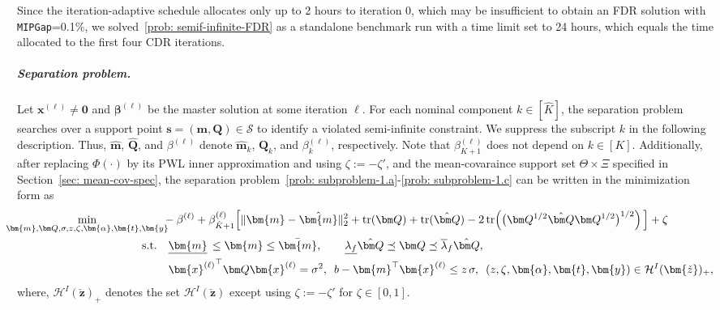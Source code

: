 \documentclass[opre,sglanonrev]{informs4}
\newcommand{\mS}{\mathcal{S}}
\newcommand{\mH}{\mathcal{H}}
\newcommand{\zz}{\check{z}}
\newcommand{\bzz}{\bm{\zz}}
\newcommand{\bbeta}{\bm{\beta}}
\newcommand{\balpha}{\bm{\alpha}}
\newcommand{\bzero}{\bm{0}}
\newcommand{\bmean}{\bm{m}}
\newcommand{\bs}{\bm{s}}
\newcommand{\bt}{\bm{t}}
\newcommand{\bx}{\bm{x}}
\newcommand{\by}{\bm{y}}
\newcommand{\bQ}{\bm Q}
\newcommand{\Tr}{\operatorname{tr}}
\begin{document}
{%



Since the iteration-adaptive schedule allocates only up to 2 hours to iteration 0, which may be insufficient to obtain an FDR solution with  \texttt{MIPGap}=0.1\%, we solved~\eqref{prob: semif-infinite-FDR} as a standalone benchmark run with a time limit set to 24 hours, which equals the time allocated to the first four CDR iterations.


\subparagraph{Separation problem.}
Let $\bx^{(\ell)}\neq\bzero$ and $\bbeta^{(\ell)}$ be the master solution at some iteration $\ell$. For each nominal component \(k\in[\hat K]\), the separation problem searches over a support point \(\bs=(\bmean,\bQ)\in\mS\) to identify a violated semi-infinite constraint.  We suppress the subscript $k$ in the following description. Thus,  \(\hat{\bmean}\), \(\hat{\bQ}\), and \(\beta^{(\ell)}\) denote \(\hat{\bmean}_k\), \(\hat{\bQ}_k\), and \(\beta_k^{(\ell)}\), respectively. Note that \(\beta_{K+1}^{(\ell)}\) does not depend on $k \in [K]$. Additionally, after replacing \(\Phi(\cdot)\) by its PWL inner approximation and using \(\zeta:=-\zeta'\), and the mean-covaraince support set $\Theta \times \Xi$ specified in Section~\ref{sec: mean-cov-spec}, the separation problem~\eqref{prob: subproblem-1.a}-\eqref{prob: subproblem-1.c} can be written in the minimization form as\vspace{-1.0em}
\begin{equation}
\begin{aligned}
\hspace{-1em}\min_{\bmean,\bQ,\sigma,z,\zeta,\balpha,\bt,\by}
&
\hspace{-0.5em}-\beta^{(\ell)}
+
\beta_{\hat K+1}^{(\ell)}
\Big[
\|\bmean-\hat{\bmean}\|_2^2
+
\Tr(\bQ)+\Tr(\hat{\bQ})
-
2\Tr\!\left(
\big(\bQ^{1/2}\hat{\bQ}\bQ^{1/2}\big)^{1/2}
\right)
\Big]
+
\zeta
\\
\mathrm{s.t.}\quad
&
 \underline{\bmean} \, \le \bmean\le \bar{\bmean}, \qquad \underline{\lambda_f}\hat{\bQ}\preceq \bQ\preceq \overline{\lambda}_f\hat{\bQ},\\
 & {\bx^{(\ell)}}^\top\bQ\bx^{(\ell)}=\sigma^2,
\,\,\, 
b-\bmean^\top\bx^{(\ell)}\le z\,\sigma,
\,\,\,
(z,\zeta,\balpha,\bt,\by)\in\mH^I(\bzz)_+ ,
\end{aligned}
\label{prob: sep-original-form}
\end{equation}
where, \(\mH^I(\bzz)_+\) denotes the set $\mH^I(\bzz)$ except using $\zeta := -\zeta'$ for $\zeta \in [0, 1]$.

}
\end{document}
